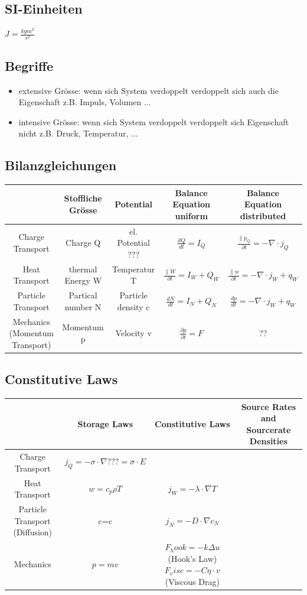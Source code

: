 \documentclass[a4paper]{scrartcl}
\begin{document}
\subsection{SI-Einheiten}
$ J = \frac{kg m^2}{s^2} $\\

\subsection{Begriffe}
\begin{itemize}
\item extensive Grösse: wenn sich System verdoppelt verdoppelt sich auch die Eigenschaft z.B. Impuls, Volumen ...
\item intensive Grösse: wenn sich System verdoppelt verdoppelt sich Eigenschaft nicht z.B. Druck, Temperatur, ...
\end{itemize}


\subsection{Bilanzgleichungen}

\begin{tabular}{|c|c|c|c|c|}
\hline  & Stoffliche Grösse & Potential & Balance Equation uniform & Balance Equation distributed \\ 
\hline Charge Transport & Charge Q & el. Potential ??? & $\frac{dQ}{dt}=I_Q$ & $ \frac{\parallel p_Q}{\partial t}=-\nabla\cdot j_Q$ \\ 
\hline Heat Transport & thermal Energy W & Temperatur T & $\frac{\parallel W}{\partial t}= I_W+Q_W$ & $\frac{\parallel w}{\partial t}= -\nabla \cdot j_W+q_W$  \\ 
\hline Particle Transport & Partical number N & Particle density c & $\frac{dN}{dt}=I_N+Q_N$ & $\frac{dp}{dt}=-\nabla \cdot j_W +q_W$ \\ 
\hline Mechanics (Momentum Transport) & Momentum p & Velocity v  & $\frac{\partial p}{\partial t}=F$ & ?? \\ 
\hline 
\end{tabular} 

\subsection{Constitutive Laws}

\begin{tabular}{|c|c|c|c|}
\hline  & Storage Laws & Constitutive Laws & Source Rates and Sourcerate Densities \\
\hline Charge Transport & $j_Q=-\sigma \cdot \nabla ??? = \sigma \cdot E$ & & \\
 
\hline Heat Transport & $w=c_p \rho T$ & $j_W=-\lambda \cdot \nabla T$ &  \\ 
\hline Particle Transport (Diffusion) & c=c & $j_N=- D \cdot \nabla c_N$ &  \\ 
\hline Mechanics & $p=mv$ & $F_hook = - k \Delta u$ (Hook's Law) $F_visc=-C \eta \cdot v$ (Viscous Drag) &  \\ 
\hline 
\end{tabular} 
\end{document}
